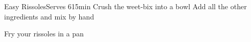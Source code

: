 \begin{recipe}{Easy Rissoles}{Serves 6}{15min}
Crush the weet-bix into a bowl
Add all the other ingredients and mix by hand

Fry your rissoles in a pan
\end{recipe}